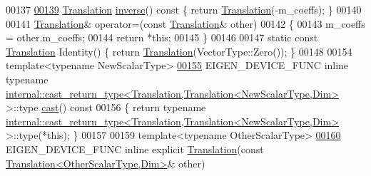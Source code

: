 \begin{DoxyCode}
00137 
\hyperlink{group___geometry___module_aa72ee6bccce7f26cbef57550308e6aaf}{00139}   \hyperlink{group___geometry___module_class_eigen_1_1_translation}{Translation} \hyperlink{group___geometry___module_aa72ee6bccce7f26cbef57550308e6aaf}{inverse}()\textcolor{keyword}{ const }\{ \textcolor{keywordflow}{return} \hyperlink{group___geometry___module_a6220051bf3a13f8180ddefbae198493e}{Translation}(-m\_coeffs); \}
00140 
00141   \hyperlink{group___geometry___module_class_eigen_1_1_translation}{Translation}& operator=(\textcolor{keyword}{const} \hyperlink{group___geometry___module_class_eigen_1_1_translation}{Translation}& other)
00142   \{
00143     m\_coeffs = other.m\_coeffs;
00144     \textcolor{keywordflow}{return} *\textcolor{keyword}{this};
00145   \}
00146 
00147   \textcolor{keyword}{static} \textcolor{keyword}{const} \hyperlink{group___geometry___module_class_eigen_1_1_translation}{Translation} Identity() \{ \textcolor{keywordflow}{return} \hyperlink{group___geometry___module_a6220051bf3a13f8180ddefbae198493e}{Translation}(VectorType::Zero()); \}
00148 
00154   \textcolor{keyword}{template}<\textcolor{keyword}{typename} NewScalarType>
\hyperlink{group___geometry___module_a1d30bbadbafd009cda142f15ff7abcc2}{00155}   EIGEN\_DEVICE\_FUNC \textcolor{keyword}{inline} \textcolor{keyword}{typename} 
      \hyperlink{struct_eigen_1_1internal_1_1cast__return__type}{internal::cast\_return\_type<Translation,Translation<NewScalarType,Dim>}
       >::type \hyperlink{group___geometry___module_a1d30bbadbafd009cda142f15ff7abcc2}{cast}()\textcolor{keyword}{ const}
00156 \textcolor{keyword}{  }\{ \textcolor{keywordflow}{return} \textcolor{keyword}{typename} 
      \hyperlink{struct_eigen_1_1internal_1_1cast__return__type}{internal::cast\_return\_type<Translation,Translation<NewScalarType,Dim>}
       >::type(*\textcolor{keyword}{this}); \}
00157 
00159   \textcolor{keyword}{template}<\textcolor{keyword}{typename} OtherScalarType>
\hyperlink{group___geometry___module_a8d5e06de92ca432d94f661ace3f0a274}{00160}   EIGEN\_DEVICE\_FUNC \textcolor{keyword}{inline} \textcolor{keyword}{explicit} \hyperlink{group___geometry___module_a8d5e06de92ca432d94f661ace3f0a274}{Translation}(\textcolor{keyword}{const} 
      \hyperlink{group___geometry___module_class_eigen_1_1_translation}{Translation<OtherScalarType,Dim>}& other)

\end{DoxyCode}
